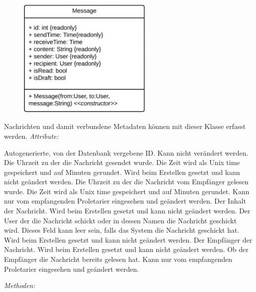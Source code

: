 \begin{itemize}
                \begin{figure}[htb]
                \centering
                \includegraphics[width=6.5cm]{Diagramms/class/singleclass/Message.pdf}
                \end{figure}
                \newline
                Nachrichten und damit verbundene Metadaten können mit dieser Klasse erfasst werden.
                \emph{Attribute:}
                \begin{itemize}
                        Autogenerierte, von der Datenbank vergebene ID.
                        Kann nicht verändert werden.
                        Die Uhrzeit zu der die Nachricht gesendet wurde.
                        Die Zeit wird als Unix time gespeichert und auf Minuten gerundet.
                        Wird beim Erstellen gesetzt und kann nicht geändert werden.
                        Die Uhrzeit zu der die Nachricht vom Empfänger gelesen wurde.
                        Die Zeit wird als Unix time gespeichert und auf Minuten gerundet.
                        Kann nur vom empfangenden Proletarier eingesehen und geändert werden.
                        Der Inhalt der Nachricht.
                        Wird beim Erstellen gesetzt und kann nicht geändert werden.
                        Der User der die Nachricht schickt oder in dessen Namen die Nachricht geschickt wird.
                        Dieses Feld kann leer sein, falls das System die Nachricht geschickt hat.
                        Wird beim Erstellen gesetzt und kann nicht geändert werden.
                        Der Empfänger der Nachricht.
                        Wird beim Erstellen gesetzt und kann nicht geändert werden.
                        Ob der Empfänger die Nachricht bereits gelesen hat.
                        Kann nur vom empfangenden Proletarier eingesehen und geändert werden.
                \end{itemize}
                \emph{Methoden:}
                \begin{itemize}
                \end{itemize}


\end{itemize}
